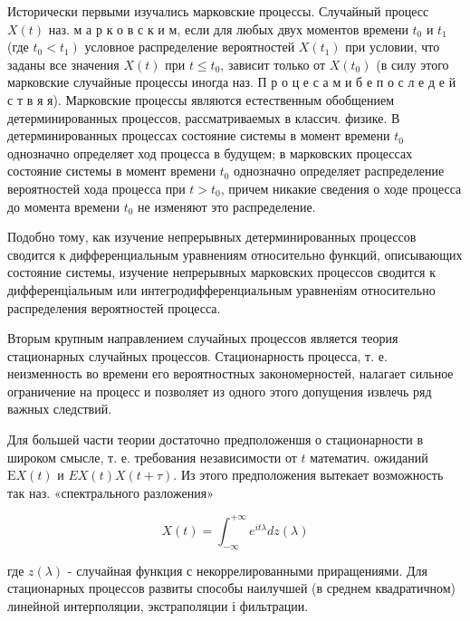 \documentclass[10pt]{article}
\begin{document}
Исторически первыми изучались марковские процессы. Случайный процесс $X(t)$ наз. м а р к о в с к и м, если для любых двух моментов времени $t_{0}$ и $t_{1}$ (где $\left.t_{0}<t_{1}\right)$ условное распределение вероятностей $X\left(t_{1}\right)$ при условии, что заданы все значения $X(t)$ при $t \leqslant t_{0}$, зависит только от $X\left(t_{0}\right)$ (в силу этого марковские случайные процессы иногда наз. П р о ц е с а м и б е п о с л е д е й с т в я я). Марковские процессы являются естественным обобщением детерминированных процессов, рассматриваемых в классич. физике. В детерминированных процессах состояние системы в момент времени $t_{0}$ однозначно определяет ход процесса в будущем; в марковских процессах состояние системы в момент времени $t_{0}$ однозначно определяет распределение вероятностей хода процесса при $t>t_{0}$, причем никакие сведения о ходе процесса до момента времени $t_{0}$ не изменяют это распределение.



Подобно тому, как изучение непрерывных детерминированных процессов сводится к дифференциальным уравнениям относительно функций, описывающих состояние системы, изучение непрерывных марковских процессов сводится к дифференціальным или интегродифференциальным уравненіям относительно распределения вероятностей процесса.



Вторым крупным направлением случайных процессов является теория стационарных случайных процессов. Стационарность процесса, т. е. неизменность во времени его вероятностных закономерностей, налагает сильное ограничение на процесс и позволяет из одного этого допущения извлечь ряд важных следствий.



Для большей части теории достаточно предположеншя о стационарности в широком смысле, т. е. требования независимости от $t$ математич. ожиданий $\mathrm{E} X(t)$ и $E X(t) X(t+\tau)$. Из этого предположения вытекает возможность так наз. «спектрального разложения»



\[

X(t)=\int_{-\infty}^{+\infty} e^{i t \lambda} d z(\lambda)

\]



где $z(\lambda)$ - случайная функция с некоррелированными приращениями. Для стационарных процессов развиты способы наилучшей (в среднем квадратичном) линейной интерполяции, экстраполяции і фильтрации.
\end{document}
